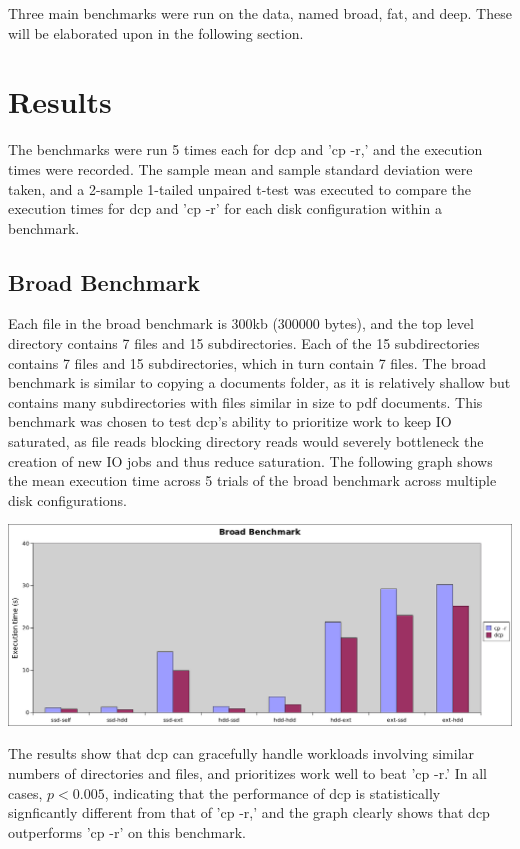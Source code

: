 \documentclass[12pt]{article}
\begin{document}
Three main benchmarks were run on the data, named broad, fat, and deep.
These will be elaborated upon in the following section.

\section{Results}
The benchmarks were run 5 times each for dcp and 'cp -r,' and the execution
times were recorded. The sample mean and sample standard deviation were taken,
and a 2-sample 1-tailed unpaired t-test was executed to compare the execution
times for dcp and 'cp -r' for each disk configuration within a benchmark.

\subsection{Broad Benchmark}
Each file in the broad benchmark is 300kb (300000 bytes), and
the top level directory contains 7 files and 15 subdirectories. Each of the 15 subdirectories
contains 7 files and 15 subdirectories, which in turn contain 7 files.
The broad benchmark is similar to copying a  documents folder, as it is
relatively shallow but contains many subdirectories with files similar in size to
pdf documents. This benchmark was chosen to test dcp's ability to prioritize work
to keep IO saturated, as file reads blocking directory reads would severely bottleneck
the creation of new IO jobs and thus reduce saturation.
The following graph shows the mean execution time across 5 trials of the broad benchmark across multiple disk configurations.
\vspace{5mm}

\includegraphics[width=500pt]{graphs/broad-manydisk.png}

\vspace{5mm}

The results show that dcp can gracefully handle workloads involving
similar numbers of directories and files, and prioritizes work
well to beat 'cp -r.' In all cases, $p < 0.005$, indicating that
the performance of dcp is statistically signficantly different from
that of 'cp -r,' and the graph clearly shows that dcp outperforms
'cp -r' on this benchmark.
\end{document}
